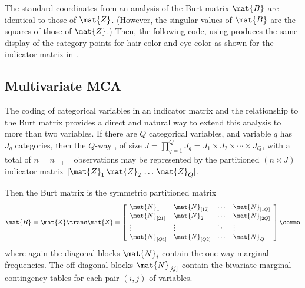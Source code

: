 \documentclass[11pt]{book}
\renewenvironment{knitrout}{\small\renewcommand{\baselinestretch}{.85}}{} %
\begin{document}
The standard coordinates from an analysis of the Burt matrix
$\mat{B}$ are identical to those of $\mat{Z}$.
(However, the singular values of $\mat{B}$ are the squares of those of $\mat{Z}$.)
Then, the following code,
using  produces the same display of the category points for
hair color and eye color as shown for the indicator matrix  in .

\begin{knitrout}
\color{fgcolor}\begin{kframe}
\begin{alltt}
 \hlkwb{<-} 
\end{alltt}
\end{kframe}
\end{knitrout}


\subsection{Multivariate MCA}\label{sec:mca-multi}
The coding of categorical variables in an indicator matrix 
and the relationship to the Burt matrix
provides
a direct and natural way to extend this analysis to more than two variables.
If there are $Q$ categorical variables, and variable $q$ has $J_q$
categories, then the $Q$-way \ctab, of size
$J = \prod_{q=1}^Q J_q = J_1 \times J_2 \times \cdots \times J_Q$,
with a total of $n = n_{++\cdots}$ observations
may be represented by the partitioned $(n \times J)$ indicator matrix
$[ \mat{Z}_1 \, \mat{Z}_2  \, \dots \, \mat{Z}_Q ]$.


Then the Burt matrix is the symmetric partitioned matrix
\begin{equation}\label{eq:burt}
 \mat{B} = \mat{Z}\trans \mat{Z}
 =
 \left[
 \begin{array}{llll}
 \mat{N}_{1} & \mat{N}_{[12]} & \cdots & \mat{N}_{[1Q]}\\
 \mat{N}_{[21]} & \mat{N}_{2} & \cdots & \mat{N}_{[2Q]}\\
 \vdots        & \vdots         & \ddots  & \vdots       \\
 \mat{N}_{[Q1]} & \mat{N}_{[Q2]} & \cdots & \mat{N}_{Q}\\
 \end{array}
 \right]
 \comma
\end{equation}
where again the diagonal blocks $\mat{N}_{i}$ contain the one-way
marginal frequencies. The off-diagonal blocks $\mat{N}_{[ij]}$
contain the bivariate marginal contingency tables for each pair 
$(i,j)$ of variables.
\end{document}
